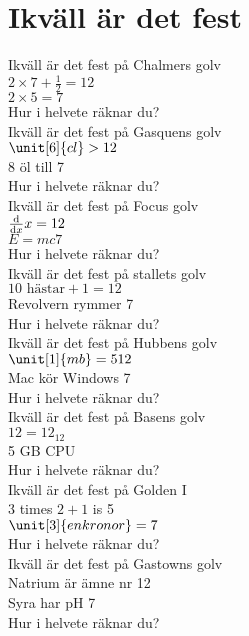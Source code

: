 \section{Ikväll är det fest}
Ikväll är det fest på Chalmers golv\\
$2\times7+\frac{1}{2}=12$\\
$2\times5=7$\\
Hur i helvete räknar du?\\

Ikväll är det fest på Gasquens golv\\
$\unit[6]{cl}>12$\\
8 öl till 7\\
Hur i helvete räknar du?\\

Ikväll är det fest på Focus golv\\
$\frac{\textnormal{d}}{\textnormal{d}x}x=12$\\
$E=mc7$\\
Hur i helvete räknar du?\\

Ikväll är det fest på stallets golv\\
$ \textrm{10 hästar}+1=12$\\
Revolvern rymmer 7\\
Hur i helvete räknar du?\\

Ikväll är det fest på Hubbens golv\\
$\unit[1]{mb}=512$\\
Mac kör Windows 7\\
Hur i helvete räknar du?\\

Ikväll är det fest på Basens golv\\
$12=12_{12}$\\
5 GB CPU\\
Hur i helvete räknar du?\\

Ikväll är det fest på Golden I\\
3 times $2+1$ is 5\\
$\unit[3]{enkronor}=7$\\
Hur i helvete räknar du?\\

Ikväll är det fest på Gastowns golv\\
Natrium är ämne nr 12\\
Syra har pH 7\\
Hur i helvete räknar du?\\



